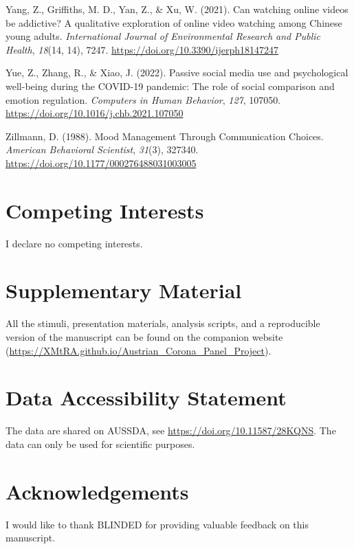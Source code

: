 \documentclass[
  man,mask,floatsintext]{apa7}
\newlength{\cslhangindent}
\newlength{\cslentryspacingunit} %
\newenvironment{CSLReferences}[2] %
 {%
  \setlength{\parindent}{0pt}
  \ifodd #1
  \let\oldpar\par
  \def\par{\hangindent=\cslhangindent\oldpar}
  \fi
  \setlength{\parskip}{#2\cslentryspacingunit}
 }%
 {}
\begin{document}
\begin{CSLReferences}{1}{0}
\leavevmode{}%
Yang, Z., Griffiths, M. D., Yan, Z., \& Xu, W. (2021). Can watching online videos be addictive? {A} qualitative exploration of online video watching among {Chinese} young adults. \emph{International Journal of Environmental Research and Public Health}, \emph{18}(14, 14), 7247. \url{https://doi.org/10.3390/ijerph18147247}

\leavevmode{}%
Yue, Z., Zhang, R., \& Xiao, J. (2022). Passive social media use and psychological well-being during the {COVID-19} pandemic: {The} role of social comparison and emotion regulation. \emph{Computers in Human Behavior}, \emph{127}, 107050. \url{https://doi.org/10.1016/j.chb.2021.107050}

\leavevmode{}%
Zillmann, D. (1988). Mood {Management Through Communication Choices}. \emph{American Behavioral Scientist}, \emph{31}(3), 327340. \url{https://doi.org/10.1177/000276488031003005}

\end{CSLReferences}

\hypertarget{competing-interests}{%
\section{Competing Interests}\label{competing-interests}}

I declare no competing interests.

\hypertarget{supplementary-material}{%
\section{Supplementary Material}\label{supplementary-material}}

All the stimuli, presentation materials, analysis scripts, and a reproducible version of the manuscript can be found on the companion website (\url{https://XMtRA.github.io/Austrian_Corona_Panel_Project}).

\hypertarget{data-accessibility-statement}{%
\section{Data Accessibility Statement}\label{data-accessibility-statement}}

The data are shared on AUSSDA, see \url{https://doi.org/10.11587/28KQNS}.
The data can only be used for scientific purposes.

\hypertarget{acknowledgements}{%
\section{Acknowledgements}\label{acknowledgements}}

I would like to thank BLINDED for providing valuable feedback on this manuscript.
\end{document}
